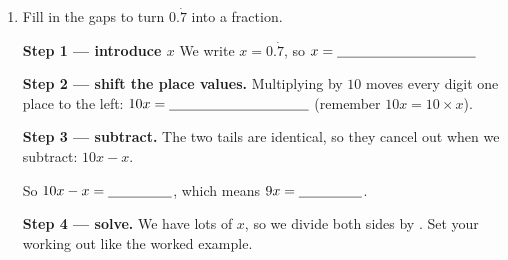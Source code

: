 \documentclass[12pt,a4paper]{article}
\newcommand{\ansline}[1][2.2cm]{\underline{\hspace{#1}}}
\newcommand{\tailbox}[4]{%
  ({0.34+#1*0.34-0.17},#3) rectangle ({0.34+#2*0.34+0.17},#4)}
\newcommand{\drowgap}[4]{%
  \node[anchor=east,font=\small] at (-1.25,#1) {#2};
  \node[anchor=east,font=\small] at (-0.12,#1) {#3};
  \node[font=\small] at (0,#1) {.};
  \foreach \i in {1,...,#4}
    {\draw[gray!60] ({0.34+(\i-1)*0.34-0.13},{#1-0.16}) --
                    ({0.34+(\i-1)*0.34+0.13},{#1-0.16});}
  \node[font=\small] at ({0.34+#4*0.34},#1) {$\ldots$};%
}
\begin{document}
\begin{enumerate}[resume]

\item Fill in the gaps to turn $0.\dot{7}$ into a fraction.

\textbf{Step 1 --- introduce $x$} We write $x=0.\dot{7}$, so
$x=\ansline[3.5cm]$

\smallskip
\textbf{Step 2 --- shift the place values.} Multiplying by $10$ moves every
digit one place to the left: \newline $10x=\ansline[3.5cm]$ (remember
$10x = 10 \times x$).

\smallskip
\textbf{Step 3 --- subtract.} The two tails are identical, so they cancel out
when we subtract: $10x-x$.

\begin{center}
\end{center}
\vspace{-2pt}
So $10x-x=\ansline[1.6cm]$, which means $9x=\ansline[1.6cm]$.

\smallskip
\textbf{Step 4 --- solve.} We have \ansline[0.9cm] lots of $x$, so we divide
both sides by \ansline[0.9cm]. Set your working out like the worked example.

\vspace{13em}

\newpage


\end{enumerate}
\end{document}
